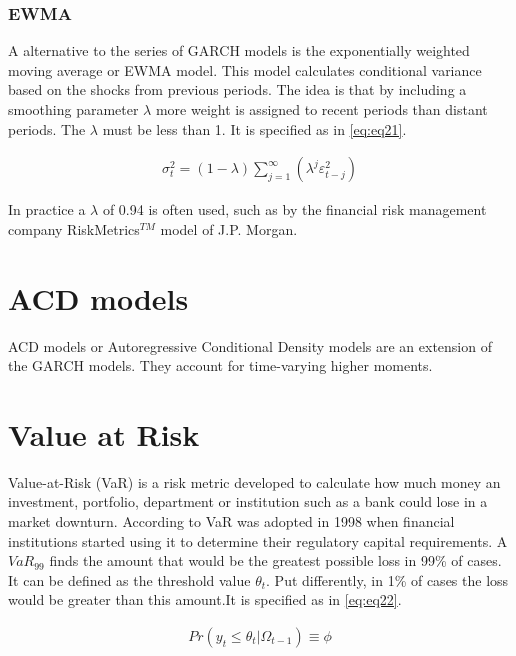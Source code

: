 \documentclass[a4paper, twoside]{templates/ociamthesis}
\begin{document}
\hypertarget{ewma}{%
\subsubsection{EWMA}\label{ewma}}

A alternative to the series of GARCH models is the exponentially weighted moving average or EWMA model. This model calculates conditional variance based on the shocks from previous periods. The idea is that by including a smoothing parameter \(\lambda\) more weight is assigned to recent periods than distant periods. The \(\lambda\) must be less than 1. It is specified as in \eqref{eq:eq21}.

\begin{align}
\sigma_t^2 = (1-\lambda) \sum\limits_{j=1}^\infty (\lambda^j \varepsilon_{t-j}^2)
 \label{eq:eq21}
\end{align}

In practice a \(\lambda\) of 0.94 is often used, such as by the financial risk management company RiskMetrics\(^{TM}\) model of J.P. Morgan.

\hypertarget{acd-models}{%
\section{ACD models}\label{acd-models}}

ACD models or Autoregressive Conditional Density models are an extension of the GARCH models. They account for time-varying higher moments.

\hypertarget{value-at-risk}{%
\section{Value at Risk}\label{value-at-risk}}

Value-at-Risk (VaR) is a risk metric developed to calculate how much money an investment, portfolio, department or institution such as a bank could lose in a market downturn. According to VaR was adopted in 1998 when financial institutions started using it to determine their regulatory capital requirements. A \(VaR_{99}\) finds the amount that would be the greatest possible loss in 99\% of cases. It can be defined as the threshold value \(\theta_t\). Put differently, in 1\% of cases the loss would be greater than this amount.It is specified as in \eqref{eq:eq22}.

\begin{align}
Pr(y_t \le \theta_t | \Omega_{t-1}) \equiv \phi
 \label{eq:eq22}
\end{align}
\end{document}
